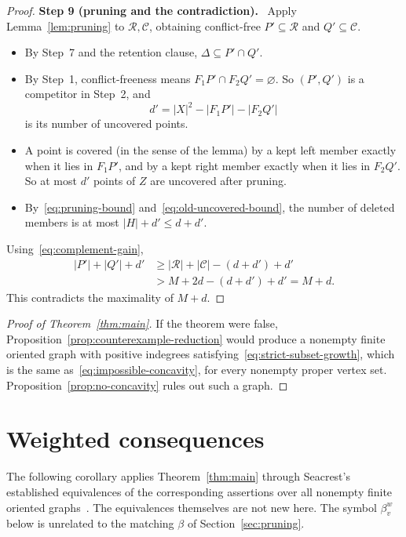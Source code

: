 \documentclass[11pt]{article}
\theoremstyle{remark}
\newcommand{\abs}[1]{\lvert #1\rvert}
\newcommand{\step}[1]{\par\medskip\noindent\textbf{Step #1.}\ }
\begin{document}
\begin{proof}
\step{9 (pruning and the contradiction)}
Apply Lemma~\ref{lem:pruning} to $\mathcal R,\mathcal C$, obtaining
conflict-free $P'\subseteq\mathcal R$ and $Q'\subseteq\mathcal C$.
\begin{itemize}[leftmargin=2em,itemsep=1pt]
\item By Step~7 and the retention clause, $\Delta\subseteq P'\cap Q'$.
\item By Step~1, conflict-freeness means $F_1P'\cap F_2Q'=\varnothing$. So
$(P',Q')$ is a competitor in Step~2, and
\[
 d'=\abs{X}^2-\abs{F_1P'}-\abs{F_2Q'}
\]
is its number of uncovered points.
\item A point is covered (in the sense of the lemma) by a kept left member
exactly when it lies in $F_1P'$, and by a kept right member exactly when it
lies in $F_2Q'$. So at most $d'$ points of $Z$ are uncovered after pruning.
\item By~\eqref{eq:pruning-bound} and~\eqref{eq:old-uncovered-bound}, the
number of deleted members is at most $\abs H+d'\le d+d'$.
\end{itemize}
Using~\eqref{eq:complement-gain},
\[
 \begin{aligned}
 \abs{P'}+\abs{Q'}+d'
 &\ge \abs{\mathcal R}+\abs{\mathcal C}-(d+d')+d'\\
 &>M+2d-(d+d')+d'=M+d.
 \end{aligned}
\]
This contradicts the maximality of $M+d$.
\end{proof}

\begin{proof}[Proof of Theorem~\ref{thm:main}]
If the theorem were false, Proposition~\ref{prop:counterexample-reduction}
would produce a nonempty finite oriented graph with positive indegrees
satisfying~\eqref{eq:strict-subset-growth}, which is the same
as~\eqref{eq:impossible-concavity}, for every nonempty proper vertex set.
Proposition~\ref{prop:no-concavity} rules out such a graph.
\end{proof}

\section{Weighted consequences}\label{sec:weighted-consequences}

The following corollary applies Theorem~\ref{thm:main} through Seacrest's
established equivalences of the corresponding assertions over all nonempty
finite oriented graphs~\cite{Seacrest2015}. The equivalences themselves are
not new here. The symbol $\beta_v^w$ below is unrelated to the matching
$\beta$ of Section~\ref{sec:pruning}.
\end{document}
